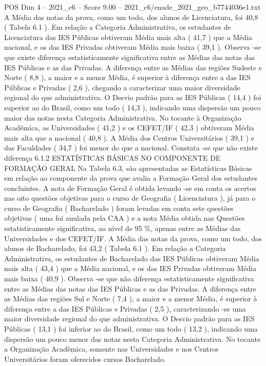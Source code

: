 \begin{textsample}{POS Dim 4 – 2021\_c6 – Score 9.00 – 2021\_c6/enade\_2021\_geo\_b7744036e1.txt}
A Média das notas da prova, como um todo, dos alunos de Licenciatura, foi 40,8 ( Tabela 6.1 ).
Em relação a Categoria Administrativa, os estudantes de Licenciatura das IES Públicas obtiveram Média mais alta ( 41,7 ) que a Média nacional, e os das IES Privadas obtiveram Média mais baixa ( 39,1 ).
Observa -se que existe diferença estatisticamente significativa entre as Médias das notas das IES Públicas e as das Privadas.
A diferença entre as Médias das regiões Sudeste e Norte ( 8,8 ), a maior e a menor Média, é superior à diferença entre a das IES Públicas e Privadas ( 2,6 ), chegando a caracterizar uma maior diversidade regional do que administrativa.
O Desvio padrão para as IES Públicas ( 14,4 ) foi superior ao do Brasil, como um todo ( 14,3 ), indicando uma dispersão um pouco maior das notas nesta Categoria Administrativa.
No tocante à Organização Acadêmica, as Universidades ( 41,2 ) e os CEFET/IF ( 42,3 ) obtiveram Média mais alta que a nacional ( 40,8 ).
A Média dos Centros Universitários ( 39,1 ) e das Faculdades ( 34,7 ) foi menor do que a nacional.
Constata -se que não existe diferença 6.1.2 ESTATÍSTICAS BÁSICAS NO COMPONENTE DE FORMAÇÃO GERAL Na Tabela 6.3, são apresentadas as Estatísticas Básicas em relação ao componente da prova que avalia a Formação Geral dos estudantes concluintes.
A nota de Formação Geral é obtida levando -se em conta os acertos nas oito questões objetivas para o curso de Geografia ( Licenciatura ), já para o curso de Geografia ( Bacharelado ) foram levadas em conta sete questões objetivas ( uma foi anulada pela CAA ) e a nota Média obtida nas Questões estatisticamente significativa, ao nível de 95 \%, apenas entre as Médias das Universidades e dos CEFET/IF.
A Média das notas da prova, como um todo, dos alunos de Bacharelado, foi 43,2 ( Tabela 6.1 ).
Em relação a Categoria Administrativa, os estudantes de Bacharelado das IES Públicas obtiveram Média mais alta ( 43,4 ) que a Média nacional, e os das IES Privadas obtiveram Média mais baixa ( 40,9 ).
Observa -se que não diferença estatisticamente significativa entre as Médias das notas das IES Públicas e as das Privadas.
A diferença entre as Médias das regiões Sul e Norte ( 7,4 ), a maior e a menor Média, é superior à diferença entre a das IES Públicas e Privadas ( 2,5 ), caracterizando -se uma maior diversidade regional do que administrativa.
O Desvio padrão para as IES Públicas ( 13,1 ) foi inferior ao do Brasil, como um todo ( 13,2 ), indicando uma dispersão um pouco menor das notas nesta Categoria Administrativa.
No tocante a Organização Acadêmica, somente nas Universidades e nos Centros Universitários foram oferecidos cursos Bacharelado.

\end{textsample}
